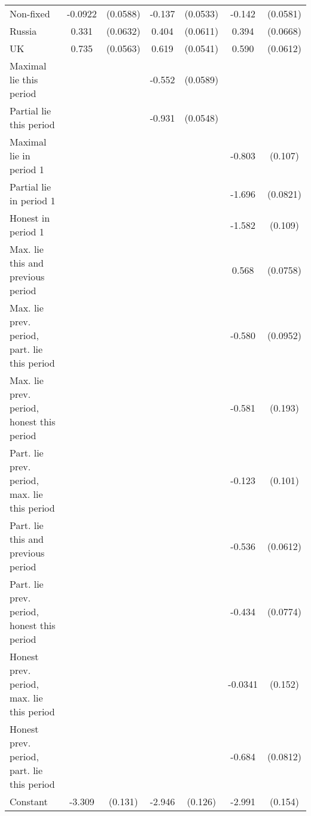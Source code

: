 {\begin{tabular}{l*{3}{cc}}
Non-fixed       &  -0.0922         & (0.0588)&   -0.137\sym{**} & (0.0533)&   -0.142\sym{**} & (0.0581)\\
Russia          &    0.331\sym{***}& (0.0632)&    0.404\sym{***}& (0.0611)&    0.394\sym{***}& (0.0668)\\
UK              &    0.735\sym{***}& (0.0563)&    0.619\sym{***}& (0.0541)&    0.590\sym{***}& (0.0612)\\
Maximal lie this period&                  &         &   -0.552\sym{***}& (0.0589)&                  &         \\
Partial lie this period&                  &         &   -0.931\sym{***}& (0.0548)&                  &         \\
Maximal lie in period 1&                  &         &                  &         &   -0.803\sym{***}&  (0.107)\\
Partial lie in period 1&                  &         &                  &         &   -1.696\sym{***}& (0.0821)\\
Honest in period 1&                  &         &                  &         &   -1.582\sym{***}&  (0.109)\\
Max. lie this and previous period&                  &         &                  &         &    0.568\sym{***}& (0.0758)\\
Max. lie prev. period, part. lie this period&                  &         &                  &         &   -0.580\sym{***}& (0.0952)\\
Max. lie prev. period, honest this period&                  &         &                  &         &   -0.581\sym{***}&  (0.193)\\
Part. lie prev. period, max. lie this period&                  &         &                  &         &   -0.123         &  (0.101)\\
Part. lie this and previous period&                  &         &                  &         &   -0.536\sym{***}& (0.0612)\\
Part. lie prev. period, honest this period&                  &         &                  &         &   -0.434\sym{***}& (0.0774)\\
Honest prev. period, max. lie this period&                  &         &                  &         &  -0.0341         &  (0.152)\\
Honest prev. period, part. lie this period&                  &         &                  &         &   -0.684\sym{***}& (0.0812)\\
Constant        &   -3.309\sym{***}&  (0.131)&   -2.946\sym{***}&  (0.126)&   -2.991\sym{***}&  (0.154)\\

\end{tabular}}
